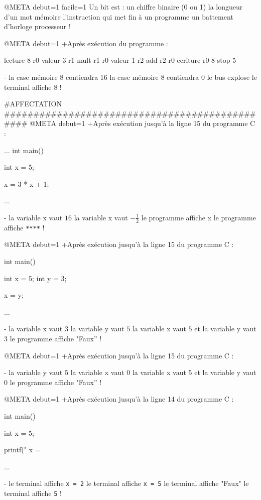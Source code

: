 @META debut=1 facile=1
Un bit est :
 un chiffre binaire (0 ou 1)
 la longueur d'un mot mémoire
 l'instruction qui met fin à un programme
 un battement d'horloge processeur
!


@META debut=1
+Après exécution du programme :
\begin{listing}{1}
lecture 8 r0
valeur 3 r1
mult r1 r0
valeur 1 r2
add r2 r0
ecriture r0 8
stop
5
\end{listing}
-
 la case mémoire 8 contiendra 16
 la case mémoire 8 contiendra 0
 le bus explose
 le terminal affiche 8
!

#AFFECTATION ###############################################
@META debut=1
+Après exécution jusqu'à la ligne 15 du programme  C :
\begin{listing}{10}
...
int main() {
    int x = 5;

    x = 3 * x + 1;

    ...
}
\end{listing}
-
 la variable x vaut $16$
 la variable x vaut $-\frac{1}{2}$
 le programme affiche x
 le programme affiche \verb+****+
!

@META debut=1
+Après exécution jusqu'à la ligne 15 du programme  C :
\begin{listing}{10}
int main() {
    int x = 5;
    int y = 3;

    x = y;

    ...
}
\end{listing}
-
 la variable x vaut $3$
 la variable y vaut $5$
 la variable x vaut $5$ et la variable y vaut $3$
 le programme affiche "Faux''
!

@META debut=1
+Après exécution jusqu'à la ligne 15 du programme  C :
\begin{listing}{10}
int main() {
    int x = 5;
    int y;

    y = x;
    ...
\end{listing}
-
 la variable y vaut $5$
 la variable x vaut $0$
 la variable x vaut $5$ et la variable y vaut $0$
 le programme affiche "Faux''
!

@META debut=1
+Après exécution jusqu'à la ligne 14 du programme  C :
\begin{listing}{10}
int main() {
    int x = 5;

    printf(" x  = %

    ...
}
\end{listing}
-
 le terminal affiche \verb+x = 2+
 le terminal affiche \verb+x = 5+
 le terminal affiche "Faux"
 le terminal affiche \verb+5+
!

